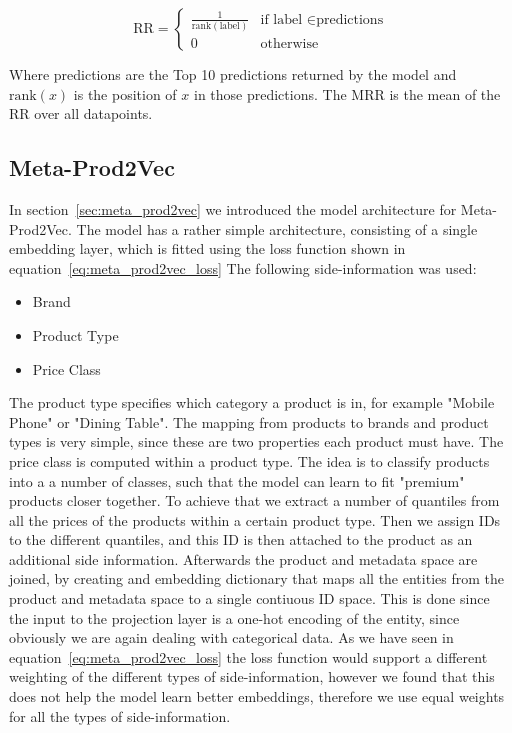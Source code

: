 \begin{equation}\label{eq:reciprocal_rank}
    \text{RR} = 
    \begin{cases}
        \frac{1}{\text{rank}(\text{label})} & \text{if label } \in \text{predictions} \\
        0 & \text{otherwise}
    \end{cases}
\end{equation}

Where predictions are the Top 10 predictions returned by the model and $\text{rank}(x)$ is the position of $x$ in those predictions.
The MRR is the mean of the RR over all datapoints.

\subsection{Meta-Prod2Vec}
In section~\ref{sec:meta_prod2vec} we introduced the model architecture for Meta-Prod2Vec.
The model has a rather simple architecture, consisting of a single embedding layer, which is fitted using the loss function shown in equation~\ref{eq:meta_prod2vec_loss}
The following side-information was used:
\begin{itemize}
    \item Brand
    \item Product Type
    \item Price Class
\end{itemize}
The product type specifies which category a product is in, for example "Mobile Phone" or "Dining Table".
The mapping from products to brands and product types is very simple, since these are two properties each product must have.
The price class is computed within a product type.
The idea is to classify products into a a number of classes, such that the model can learn to fit "premium" products closer together.
To achieve that we extract a number of quantiles from all the prices of the products within a certain product type.
Then we assign IDs to the different quantiles, and this ID is then attached to the product as an additional side information.
Afterwards the product and metadata space are joined, by creating and embedding dictionary that maps all the entities from the product and metadata space to a single contiuous ID space.
This is done since the input to the projection layer is a one-hot encoding of the entity, since obviously we are again dealing with categorical data.
As we have seen in equation~\ref{eq:meta_prod2vec_loss} the loss function would support a different weighting of the different types of side-information, however we found that this does not help the model learn better embeddings, therefore we use equal weights for all the types of side-information.
